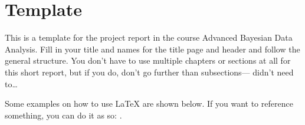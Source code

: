 \documentclass[12pt]{article}
\begin{document}
\begin{titlepage}
        \centering %
        \vspace*{\baselineskip} %
        
        {\huge YOUR TITLE}\\[0.2\baselineskip] %
        
        
        \vspace*{\baselineskip}
        
        {\Large --- Project Report ---\\
          Advanced Bayesian Data Analysis\\[\baselineskip]} %
        \vspace*{\baselineskip}
        
        {\LARGE Eldaleona Odole \and Leonor Cunha \and Anarghya Murthy\\[\baselineskip]} %
        
        \vspace*{\baselineskip}

        \vfill
        
        \today \par %
        
        \vspace*{\baselineskip}

        {\itshape TU Dortmund University\par} %
    \end{titlepage}

\clearpage

\section{Template}
This is a template for the project report in the course Advanced Bayesian Data Analysis.
Fill in your title and names for the title page and header and follow the general structure. You don't have to use multiple chapters or sections at all for this short report, but if you do, don't go further than subsections--- \textcite{feynman1963lnphysics} didn't need to\ldots

Some examples on how to use \LaTeX{} are shown below. If you want to reference something, you can do it as so:
\textcite{mcelreath2016statistical}.
\end{document}
